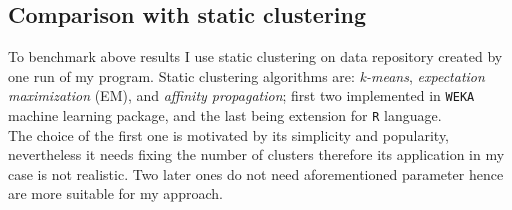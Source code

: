 \documentclass[11pt, letterpaper]{article}            %
\begin{document}
\subsection{Comparison with static clustering}
To benchmark above results I use static clustering on data repository created by one run of my program. Static clustering algorithms are: \emph{k-means}, \emph{expectation maximization} (EM), and \emph{affinity propagation}; first two implemented in \texttt{WEKA} machine learning package, and the last being extension for \texttt{R} language.\\
The choice of the first one is motivated by its simplicity and popularity, nevertheless it needs fixing the number of clusters therefore its application in my case is not realistic. Two later ones do not need aforementioned parameter hence are more suitable for my approach.\\
\end{document}
